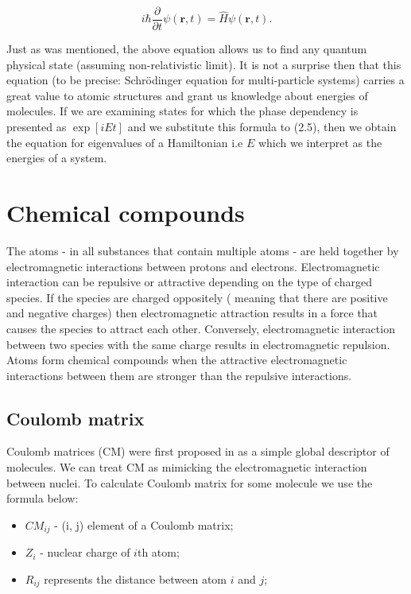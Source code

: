 \documentclass[a4paper,oneside,openright,11pt]{book}
\begin{document}
\begin{equation}
    i \hbar \frac{\partial}{\partial t} \psi(\textbf{r}, t) = \hat{H} \psi(\textbf{r}, t).
\end{equation}


Just as was mentioned, the above equation allows us to find any quantum physical state (assuming non-relativistic limit). It is not a surprise then that this equation (to be precise: Schrödinger equation for multi-particle systems) carries a great value to atomic structures and grant us knowledge about energies of molecules. If we are examining states for which the phase dependency is presented as $\exp{[iEt]}$ and we substitute this formula to (2.5), then we obtain the equation for eigenvalues of a Hamiltonian i.e $E$ which we interpret as the energies of a system.

\section{Chemical compounds}

The atoms - in all substances that contain multiple atoms - are held together by electromagnetic interactions between protons and electrons. Electromagnetic interaction can be repulsive or attractive depending on the type of charged species. If the species are charged oppositely ( meaning that there are positive and negative charges) then electromagnetic attraction results in a force that causes the species to attract each other. Conversely, electromagnetic interaction between two species with the same charge results in electromagnetic repulsion. Atoms form chemical compounds when the attractive electromagnetic interactions between them are stronger than the repulsive interactions.


\subsection{Coulomb matrix}

Coulomb matrices (CM) were first proposed in \cite{rupp} as a simple global descriptor of molecules. We can treat CM as mimicking the electromagnetic interaction between nuclei. To calculate Coulomb matrix for some molecule we use the formula below:

\begin{itemize}
    \item $CM_{ij}$ - (i, j) element of a Coulomb matrix;
    \item $Z_{i}$ - nuclear charge of $i$th atom;
    \item $R_{ij}$ represents the distance between atom $i$ and $j$;
\end{itemize}
\end{document}
